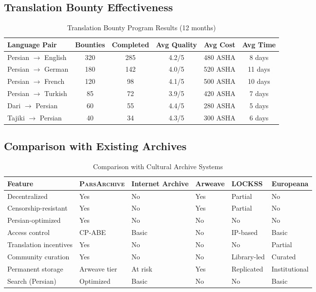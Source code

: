 \documentclass[11pt,a4paper]{article}
\newcommand{\parsarch}{\textsc{ParsArchive}\xspace}
\begin{document}
\subsection{Translation Bounty Effectiveness}

\begin{table}[H]
\centering
\caption{Translation Bounty Program Results (12 months)}
\label{tab:translation}
\begin{tabular}{lccccc}
\toprule
\textbf{Language Pair} & \textbf{Bounties} & \textbf{Completed} & \textbf{Avg Quality} & \textbf{Avg Cost} & \textbf{Avg Time} \\
\midrule
Persian $\rightarrow$ English & 320 & 285 & 4.2/5 & 480 ASHA & 8 days \\
Persian $\rightarrow$ German & 180 & 142 & 4.0/5 & 520 ASHA & 11 days \\
Persian $\rightarrow$ French & 120 & 98 & 4.1/5 & 500 ASHA & 10 days \\
Persian $\rightarrow$ Turkish & 85 & 72 & 3.9/5 & 420 ASHA & 7 days \\
Dari $\rightarrow$ Persian & 60 & 55 & 4.4/5 & 280 ASHA & 5 days \\
Tajiki $\rightarrow$ Persian & 40 & 34 & 4.3/5 & 300 ASHA & 6 days \\
\bottomrule
\end{tabular}
\end{table}

\subsection{Comparison with Existing Archives}

\begin{table}[H]
\centering
\caption{Comparison with Cultural Archive Systems}
\label{tab:compare}
\begin{tabularx}{\textwidth}{lXXXXX}
\toprule
\textbf{Feature} & \textbf{\parsarch} & \textbf{Internet Archive} & \textbf{Arweave} & \textbf{LOCKSS} & \textbf{Europeana} \\
\midrule
Decentralized & Yes & No & Yes & Partial & No \\
Censorship-resistant & Yes & No & Yes & Partial & No \\
Persian-optimized & Yes & No & No & No & No \\
Access control & CP-ABE & Basic & No & IP-based & Basic \\
Translation incentives & Yes & No & No & No & Partial \\
Community curation & Yes & No & No & Library-led & Curated \\
Permanent storage & Arweave tier & At risk & Yes & Replicated & Institutional \\
Search (Persian) & Optimized & Basic & No & No & Basic \\
\bottomrule
\end{tabularx}
\end{table}
\end{document}
